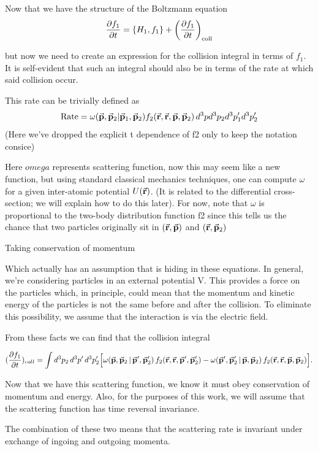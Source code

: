 Now that we have the structure of the Boltzmann equation
\[
\pdv{f_1}{t} = \pb{H_1}{f_1} + \left(\pdv{f_1}{t}  \right)_{\text{coll}}
  \]

  but now we need to create an expression for the collision integral in terms of $f_1$. It is self-evident that such an integral should also be in terms of the rate at which said collision occur.

  This rate can be trivially defined as
\[
\text{Rate} = \omega(\va{p},\va{p}_2 \vert \va{p}_1,\va{p}_2 ) f_2(\va{r},\va{r}, \va{p},\va{p}_2) \, d^3p d^3p_2 d^3p_1' d^3p_2'
  \]
  (Here we’ve dropped the explicit t dependence of f2 only to keep the notation consice)

  Here $omega$ represents scattering function, now this may seem like a new function, but using standard classical mechanics techniques, one can compute $\omega$ for a given inter-atomic potential $U(\va{r})$. (It is related to the differential cross-section; we will explain how to do this later). For now, note that $\omega$ is proportional to the two-body distribution function f2 since this tells us the chance that two particles originally sit in $(\va{r}, \va{p})$ and $(\va{r}, \va{p}_2)$

Taking conservation of momentum

Which actually has an assumption that is hiding in these equations. In general, we’re considering particles in an external potential V. This provides a force on the particles which, in principle, could mean that the momentum and kinetic energy of the particles is not the same before and after the collision. To eliminate this possibility, we assume that the interaction is via the electric field.

From these facts we can find that the collision integral

\[
(\pdv{f_1}{t})_{coll} = \int d^3p_2\,d^3p'\,d^3p_2'\Big[\omega(\va p,\va p_2\,|\,\va p',\va p_2')\,f_2(\va r,\va r,\va p',\va p_2') - \omega(\va p',\va p_2'\,|\,\va p,\va p_2)\,f_2(\va r,\va r,\va p,\va p_2)\Big].
  \]

  Now that we have this scattering function, we know it must obey conservation of momentum and energy. Also, for the purposes of this work, we will assume that the scattering function has time reversal invariance.

  The combination of these two means that the scattering rate is invariant under exchange of ingoing and outgoing momenta.

